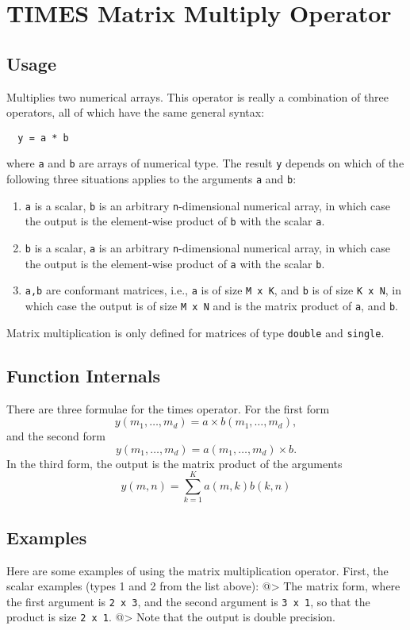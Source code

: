\section{TIMES Matrix Multiply Operator}

\subsection{Usage}

Multiplies two numerical arrays.  This operator is really a combination
of three operators, all of which have the same general syntax:
\begin{verbatim}
  y = a * b
\end{verbatim}
where \verb|a| and \verb|b| are arrays of numerical type.  The result \verb|y| depends
on which of the following three situations applies to the arguments
\verb|a| and \verb|b|:
\begin{enumerate}
\item  \verb|a| is a scalar, \verb|b| is an arbitrary \verb|n|-dimensional numerical array, in which case the output is the element-wise product of \verb|b| with the scalar \verb|a|.

\item  \verb|b| is a scalar, \verb|a| is an arbitrary \verb|n|-dimensional numerical array, in which case the output is the element-wise product of \verb|a| with the scalar \verb|b|.

\item  \verb|a,b| are conformant matrices, i.e., \verb|a| is of size \verb|M x K|, and \verb|b| is of size \verb|K x N|, in which case the output is of size \verb|M x N| and is the matrix product of \verb|a|, and \verb|b|.

\end{enumerate}
Matrix multiplication is only defined for matrices of type \verb|double| 
and \verb|single|.
\subsection{Function Internals}

There are three formulae for the times operator.  For the first form
\[
y(m_1,\ldots,m_d) = a \times b(m_1,\ldots,m_d),
\]
and the second form
\[
y(m_1,\ldots,m_d) = a(m_1,\ldots,m_d) \times b.
\]
In the third form, the output is the matrix product of the arguments
\[
y(m,n) = \sum_{k=1}^{K} a(m,k) b(k,n)
\]
\subsection{Examples}

Here are some examples of using the matrix multiplication operator.  First,
the scalar examples (types 1 and 2 from the list above):
@>
The matrix form, where the first argument is \verb|2 x 3|, and the
second argument is \verb|3 x 1|, so that the product is size 
\verb|2 x 1|.
@>
Note that the output is double precision.
